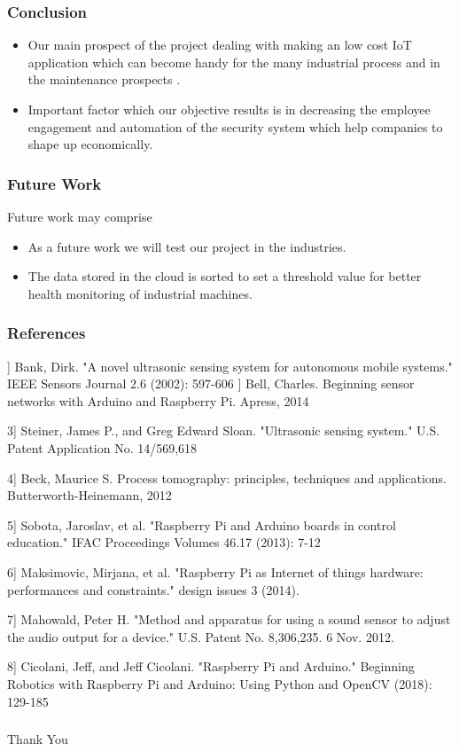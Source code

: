 \documentclass{beamer}
\begin{document}
\begin{frame}\frametitle{Conclusion}
\item 
\begin{itemize}
    
\end{itemize}
\begin{itemize}
\item Our main prospect of the project dealing with making an low cost IoT application which can become handy for the many industrial process and in the maintenance prospects .
\item 
Important factor which our objective results is in decreasing the employee engagement and automation of the security system which help companies to shape up economically.
\end{itemize}
\end{frame}
\begin{frame}\frametitle{Future Work}
Future work may comprise
\begin{itemize}
\item As a future work we will test our project in the industries.
\item The data stored in the cloud is sorted to set a threshold value for better health monitoring of industrial machines.
\Item 
\end{itemize}
\end{frame}
\begin{frame}[shrink=25]\frametitle{References}
] Bank, Dirk. "A novel ultrasonic sensing system for autonomous mobile systems." IEEE Sensors Journal 2.6 (2002): 597-606
] Bell, Charles. Beginning sensor networks with Arduino and Raspberry Pi. Apress, 2014
\item 3] Steiner, James P., and Greg Edward Sloan. "Ultrasonic sensing system." U.S. Patent Application No. 14/569,618
\item 4]  Beck, Maurice S. Process tomography: principles, techniques and applications. Butterworth-Heinemann, 2012
\item 5] Sobota, Jaroslav, et al. "Raspberry Pi and Arduino boards in control education." IFAC Proceedings Volumes 46.17 (2013): 7-12
\item 6] Maksimovic, Mirjana, et al. "Raspberry Pi as Internet of things hardware: performances and constraints." design issues 3 (2014).
\item 7] Mahowald, Peter H. "Method and apparatus for using a sound sensor to adjust the audio output for a device." U.S. Patent No. 8,306,235. 6 Nov. 2012.
\item 8] Cicolani, Jeff, and Jeff Cicolani. "Raspberry Pi and Arduino." Beginning Robotics with Raspberry Pi and Arduino: Using Python and OpenCV (2018): 129-185
\end{frame}

\begin{frame}\frametitle{}
\Huge
\begin{center}Thank You \end{center}
\end{frame}
\end{document}
